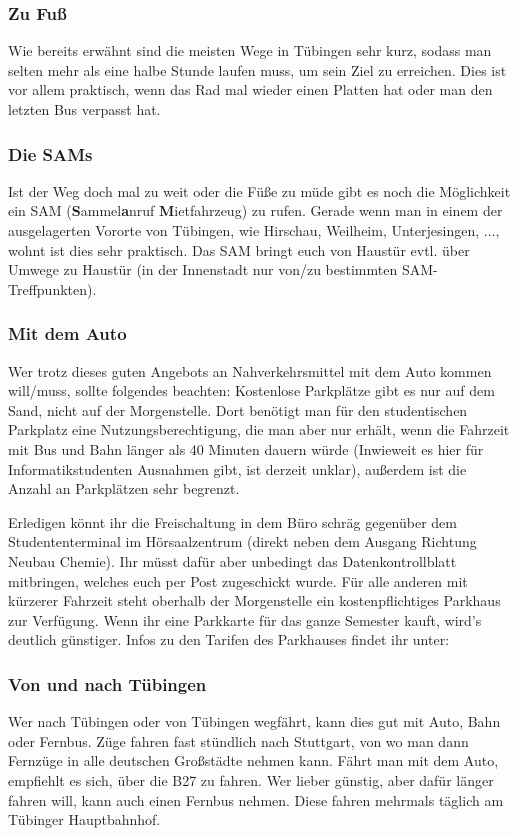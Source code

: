 \subsubsection*{Zu Fuß}
Wie bereits erwähnt sind die meisten Wege in Tübingen sehr kurz, sodass man selten mehr als eine halbe Stunde laufen muss, um sein Ziel zu erreichen. Dies ist vor allem praktisch, wenn das Rad mal wieder einen Platten hat oder man den letzten Bus verpasst hat.

\subsubsection*{Die SAMs}
Ist der Weg doch mal zu weit oder die Füße zu müde gibt es noch die Möglichkeit ein SAM (\textbf{S}ammel\textbf{a}nruf
\textbf{M}ietfahrzeug) zu rufen. Gerade wenn man in einem der ausgelagerten Vororte von Tübingen, wie Hirschau,
Weilheim, Unterjesingen, ..., wohnt ist dies sehr praktisch. Das SAM bringt euch von Haustür evtl. über Umwege zu Haustür (in der Innenstadt nur von/zu bestimmten SAM-Treffpunkten).

\subsubsection*{Mit dem Auto}
Wer trotz dieses guten Angebots an Nahverkehrsmittel mit dem Auto kommen will/muss, sollte folgendes beachten: Kostenlose Parkplätze gibt es nur auf dem Sand, nicht auf der Morgenstelle.  Dort benötigt man für den studentischen Parkplatz eine Nutzungsberechtigung, die man aber nur erhält, wenn die Fahrzeit mit Bus und Bahn länger als 40 Minuten dauern würde (Inwieweit es hier für Informatikstudenten Ausnahmen gibt, ist derzeit unklar), außerdem ist die Anzahl an Parkplätzen sehr begrenzt.

 Erledigen könnt ihr die Freischaltung in dem Büro schräg gegenüber dem Studententerminal im Hörsaalzentrum (direkt neben dem Ausgang Richtung Neubau Chemie). Ihr müsst dafür aber unbedingt das Datenkontrollblatt mitbringen, welches euch per Post zugeschickt wurde. Für alle anderen mit kürzerer Fahrzeit steht oberhalb der Morgenstelle ein kostenpflichtiges Parkhaus zur Verfügung. Wenn ihr eine Parkkarte für das ganze Semester kauft, wird's deutlich günstiger. Infos zu den Tarifen des Parkhauses findet ihr unter:



\subsubsection*{Von und nach Tübingen}
Wer nach Tübingen oder von Tübingen wegfährt, kann dies gut mit Auto, Bahn oder Fernbus. Züge fahren fast stündlich nach Stuttgart, von wo man dann Fernzüge in alle deutschen Großstädte nehmen kann. Fährt man mit dem Auto, empfiehlt es sich, über die B27 zu fahren. Wer lieber günstig, aber dafür länger fahren will, kann auch einen Fernbus nehmen. Diese fahren mehrmals täglich am Tübinger Hauptbahnhof.
